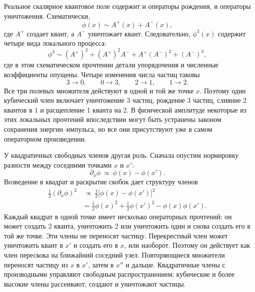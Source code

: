 Реальное скалярное квантовое поле содержит и операторы рождения, и операторы уничтожения. Схематически,
\begin{equation}
\phi(x)\sim A^+(x)+A^-(x),
\end{equation}
где \(A^+\) создает квант, а \(A^-\) уничтожает квант. Следовательно, \(\phi^3(x)\) содержит четыре вида локального процесса:
\begin{equation}
\phi^3
\sim
(A^+)^3+(A^+)^2A^-+A^+(A^-)^2+(A^-)^3,
\end{equation}
где в этом схематическом прочтении детали упорядочения и численные коэффициенты опущены. Четыре изменения числа частиц таковы
\begin{equation}
3\longrightarrow0,
\qquad
0\longrightarrow3,
\qquad
2\longrightarrow1,
\qquad
1\longrightarrow2.
\end{equation}
Все три полевых множителя действуют в одной и той же точке \(x\). Поэтому один кубический член включает уничтожение 3 частиц, рождение 3 частиц, слияние 2 квантов в 1 и расщепление 1 кванта на 2. В физической амплитуде некоторые из этих локальных прочтений впоследствии могут быть устранены законом сохранения энергии--импульса, но все они присутствуют уже в самом операторном произведении.

У квадратичных свободных членов другая роль. Сначала опустим нормировку разности между соседними точками \(x\) и \(x'\):
\begin{equation}
\partial_x\phi
\ \propto\
\phi(x)-\phi(x').
\end{equation}
Возведение в квадрат и раскрытие скобок дает структуру членов
\begin{align}
\frac12(\partial_x\phi)^2
&\ \propto\
\frac12\bigl[\phi(x)-\phi(x')\bigr]^2
\\
&=
\frac12\phi(x)^2
+\frac12\phi(x')^2
-\phi(x)\phi(x').
\end{align}
Каждый квадрат в одной точке имеет несколько операторных прочтений: он может создать 2 кванта, уничтожить 2 или уничтожить один и снова создать его в той же точке. Эти члены не переносят частицу. Перекрестный член может уничтожить квант в \(x'\) и создать его в \(x\), или наоборот. Поэтому он действует как член перескока на ближайний соседний узел. Повторяющиеся множители переносят частицу из \(x\) в \(x'\), затем в \(x''\) и дальше. Квадратичные члены с производными управляют свободным распространением; кубические и более высокие члены рассеивают, создают и уничтожают частицы.

\begin{classroomqa}
\end{classroomqa}

